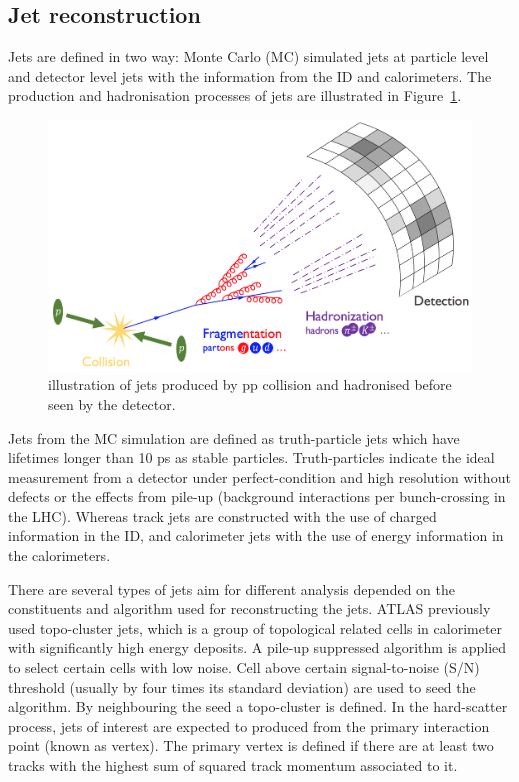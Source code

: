 \subsection{Jet reconstruction}
\label{sec:4.1}

Jets are defined in two way:  Monte Carlo (MC) simulated jets at particle level and detector level jets with the information from the ID and calorimeters. The production and hadronisation processes of jets are illustrated in Figure~\ref{Fig.jet}.

\begin{figure}[htb] 
	\centering  
	\includegraphics[width=15cm]{./fig/jet.jpg}	\caption{illustration of jets produced by pp collision and hadronised before seen by the detector.}
	\label{Fig.jet}
\end{figure}

Jets from the MC simulation are defined as truth-particle jets which have lifetimes longer than 10 ps as stable particles. Truth-particles indicate the ideal measurement from a detector under perfect-condition and high resolution without defects or the effects from pile-up (background interactions per bunch-crossing in the LHC). Whereas track jets are constructed with the use of charged information in the ID, and calorimeter jets with the use of energy information in the calorimeters.

There are several types of jets aim for different analysis depended on the constituents and algorithm used for reconstructing the jets. ATLAS previously used topo-cluster jets, which is a group of topological related cells in calorimeter with significantly high energy deposits. A pile-up suppressed algorithm is applied to select certain cells with low noise. Cell above certain signal-to-noise (S/N) threshold (usually by four times its standard deviation) are used to seed the algorithm. By neighbouring the seed a topo-cluster is defined. In the hard-scatter process, jets of interest are expected to produced from the primary interaction point (known as vertex). The primary vertex is defined if there are at least two tracks with the highest sum of squared track momentum associated to it.

